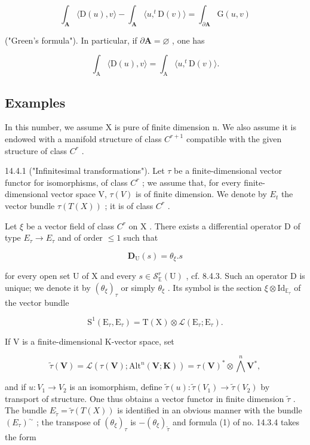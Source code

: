 \[
\int_ {\mathbf {A}} \langle \mathrm{D} (u), v \rangle - \int_ {\mathbf {A}} \langle u, ^ {t} \mathrm{D} (v) \rangle = \int_ {\partial \mathbf {A}} \mathrm{G} (u, v)
\]

("Green's formula"). In particular, if \(\partial\mathbf{A}=\varnothing\) , one has

\[
\int_ {\mathrm{A}} \langle \mathrm{D} (u), v \rangle = \int_ {\mathrm{A}} \langle u, ^ {t} \mathrm{D} (v) \rangle .
\]


\subsection{Examples}

In this number, we assume X is pure of finite dimension n. We also assume it is endowed with a manifold structure of class \(C^{r+1}\) compatible with the given structure of class \(C^{r}\) .

14.4.1 ("Infinitesimal transformations"). Let \(\tau\) be a finite-dimensional vector functor for isomorphisms, of class \(C^r\) ; we assume that, for every finite-dimensional vector space V, \(\tau(V)\) is of finite dimension. We denote by \(E_t\) the vector bundle \(\tau(T(X))\) ; it is of class \(C^r\) .

Let \(\xi\) be a vector field of class \(C^r\) on X . There exists a differential operator D of type \(E_{\tau} \to E_{\tau}\) and of order \(\leqslant1\) such that

\[
\mathbf {D} _ {\mathrm{U}} (s) = \theta_ {\xi}. s
\]

for every open set U of X and every \(s \in \mathcal{S}_{\mathbb{E}}^{r}(\mathrm{U})\) , cf. 8.4.3. Such an operator D is unique; we denote it by \((\theta_{\xi})_{\tau}\) or simply \(\theta_{\xi}\) . Its symbol is the section \(\xi \otimes \mathrm{Id}_{\mathbb{E}_{\tau}}\) of the vector bundle

\[
\mathrm{S} ^ {1} (\mathrm{E} _ {\tau}, \mathrm{E} _ {\tau}) = \mathrm{T} (\mathrm{X}) \otimes \mathscr {L} (\mathrm{E} _ {\tau}; \mathrm{E} _ {\tau}).
\]

If V is a finite-dimensional K-vector space, set

\[
\tilde {\tau} (\mathbf {V}) = \mathscr {L} (\tau (\mathbf {V}); \mathrm{Alt} ^ {n} (\mathbf {V}; \mathbf {K})) = \tau (\mathbf {V}) ^ {*} \otimes \bigwedge^ {n} \mathbf {V} ^ {*},
\]

and if \(u\colon V_{1}\to V_{2}\) is an isomorphism, define \(\tilde{\tau}(u)\colon\tilde{\tau}(V_{1})\to\tilde{\tau}(V_{2})\) by transport of structure. One thus obtains a vector functor in finite dimension \(\tilde{\tau}\) . The bundle \(E_{\tilde{\tau}}=\tilde{\tau}(T(X))\) is identified in an obvious manner with the bundle \((E_{\tau})^{\sim}\) ; the transpose of \((\theta_{\xi})_{\tau}\) is \(-( \theta_{\xi})_{\tilde{\tau}}\) and formula (1) of no. 14.3.4 takes the form

